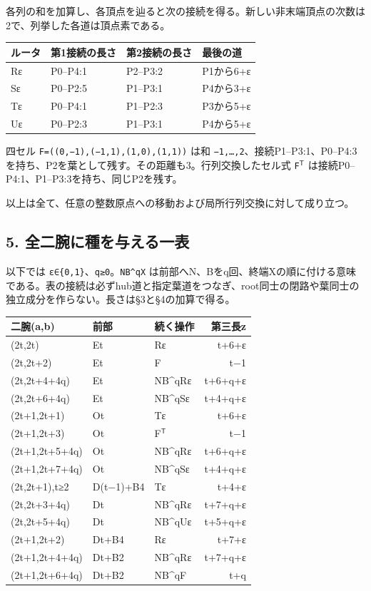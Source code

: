 \documentclass[
  10pt,
  a4paper,
]{article}
\let\originaltexttt\texttt
\renewcommand{\texttt}[1]{\leavevmode\allowbreak\mbox{\originaltexttt{#1}}}
\begin{document}
各列の和を加算し、各頂点を辿ると次の接続を得る。新しい非末端頂点の次数は2で、列挙した各道は頂点素である。

\begin{center}
\begin{tabular}{@{}llll@{}}
\toprule\noalign{}
ルータ & 第1接続の長さ & 第2接続の長さ & 最後の道 \\
\midrule\noalign{}
Rε & P0--P4:1 & P2--P3:2 & P1から6+ε \\
Sε & P0--P2:5 & P1--P3:1 & P4から3+ε \\
Tε & P0--P4:1 & P1--P2:3 & P3から5+ε \\
Uε & P0--P2:3 & P1--P3:1 & P4から5+ε \\
\bottomrule
\end{tabular}
\end{center}

四セル \texttt{F=((0,−1),(−1,1),(1,0),(1,1))} は和
\texttt{−1,…,2}、接続P1--P3:1、P0--P4:3を持ち、P2を葉として残す。その距離も3。行列交換したセル式
\texttt{F\ensuremath{^{\mathsf{T}}}} は接続P0--P4:1、P1--P3:3を持ち、同じP2を残す。

以上は全て、任意の整数原点への移動および局所行列交換に対して成り立つ。

\Needspace{365pt}
\subsection{5.
全二腕に種を与える一表}\label{ux5168ux4e8cux8155ux306bux7a2eux3092ux4e0eux3048ux308bux4e00ux8868}

以下では \texttt{ε∈\{0,1\}}、\texttt{q≥0}。\texttt{NB\^{}qX}
は前部へN、Bをq回、終端Xの順に付ける意味である。表の接続は必ずhub道と指定葉道をつなぎ、root同士の閉路や葉同士の独立成分を作らない。長さは§3と§4の加算で得る。

\begin{center}
\begin{tabular}{@{}lllr@{}}
\toprule\noalign{}
二腕(a,b) & 前部 & 続く操作 & 第三長z \\
\midrule\noalign{}
(2t,2t) & Et & Rε & t+6+ε \\
(2t,2t+2) & Et & F & t−1 \\
(2t,2t+4+4q) & Et & NB\^{}qRε & t+6+q+ε \\
(2t,2t+6+4q) & Et & NB\^{}qSε & t+4+q+ε \\
(2t+1,2t+1) & Ot & Tε & t+6+ε \\
(2t+1,2t+3) & Ot & F\ensuremath{^{\mathsf{T}}} & t−1 \\
(2t+1,2t+5+4q) & Ot & NB\^{}qRε & t+6+q+ε \\
(2t+1,2t+7+4q) & Ot & NB\^{}qSε & t+4+q+ε \\
(2t,2t+1),t≥2 & D(t−1)+B4 & Tε & t+4+ε \\
(2t,2t+3+4q) & Dt & NB\^{}qRε & t+7+q+ε \\
(2t,2t+5+4q) & Dt & NB\^{}qUε & t+5+q+ε \\
(2t+1,2t+2) & Dt+B4 & Rε & t+7+ε \\
(2t+1,2t+4+4q) & Dt+B2 & NB\^{}qRε & t+7+q+ε \\
(2t+1,2t+6+4q) & Dt+B2 & NB\^{}qF & t+q \\
\bottomrule
\end{tabular}
\end{center}
\end{document}
